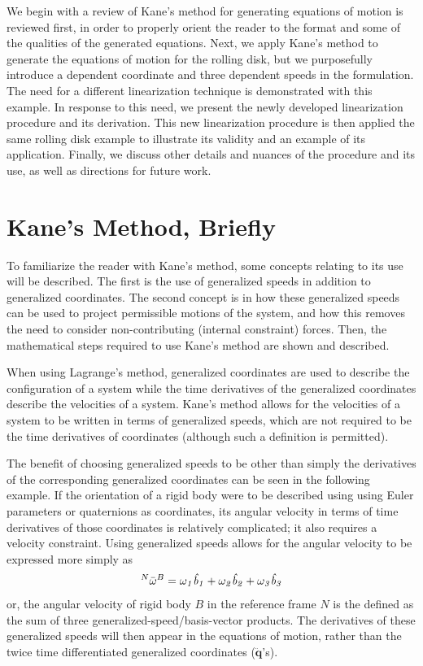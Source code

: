 \documentclass[smallcondensed,final]{svjour3}                     %
\begin{document}
We begin with a review of Kane's method for generating equations of motion is
reviewed first, in order to properly orient the reader to the format and some
of the qualities of the generated equations. Next, we apply Kane's method to
generate the equations of motion for the rolling disk, but we purposefully
introduce a dependent coordinate and three dependent speeds in the formulation.
The need for a different linearization technique is demonstrated with this
example. In response to this need, we present the newly developed linearization
procedure and its derivation.  This new linearization procedure is then applied
the same rolling disk example to illustrate its validity and an example of its
application.  Finally, we discuss other details and nuances of the procedure
and its use, as well as directions for future work.

\section{Kane's Method, Briefly}
\label{sec:kane_method}
To familiarize the reader with Kane's method, some concepts relating to its use
will be described.  The first is the use of generalized speeds in addition to
generalized coordinates.  The second concept is in how these generalized speeds
can be used to project permissible motions of the system, and how this removes
the need to consider non-contributing (internal constraint) forces.  Then, the
mathematical steps required to use Kane's method are shown and described.

When using Lagrange's method, generalized coordinates are used to describe the
configuration of a system while the time derivatives of the generalized
coordinates describe the velocities of a system.  Kane's method allows for the
velocities of a system to be written in terms of generalized speeds, which are
not required to be the time derivatives of coordinates (although such a
definition is permitted).

The benefit of choosing generalized speeds to be other than simply the
derivatives of the corresponding generalized coordinates can be seen in the
following example. If the orientation of a rigid body were to be described
using using Euler parameters or quaternions as coordinates, its angular
velocity in terms of time derivatives of those coordinates is relatively
complicated; it also requires a velocity constraint. Using generalized speeds
allows for the angular velocity to be expressed more simply as
\begin{align}
\label{eq:ex1}
{^N}\bar{\omega}^B = \it{\omega}_1 \hat{b}_1 + \it{\omega}_2 \hat{b}_2 +
\it{\omega}_3 \hat{b}_3
\end{align}
or, the angular velocity of rigid body $B$ in the reference frame $N$ is the
defined as the sum of three generalized-speed/basis-vector products.
The derivatives of these generalized speeds will then appear in the equations
of motion, rather than the twice time differentiated generalized coordinates
($\ddot{\mathbf{q}}$'s).
\end{document}
